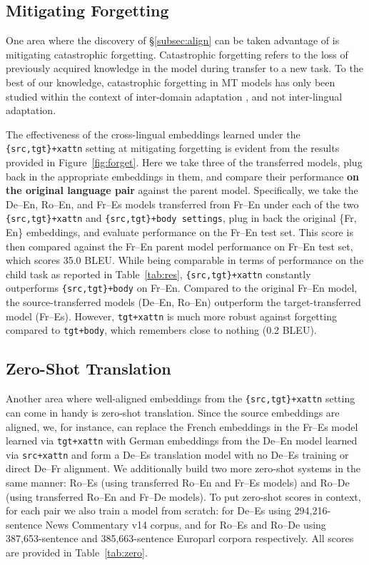 \subsection{Mitigating Forgetting}

One area where the discovery of \S\ref{subsec:align} can be taken advantage of is mitigating catastrophic forgetting. Catastrophic forgetting refers to the loss of previously acquired knowledge in the model during transfer to a new task. To the best of our knowledge, catastrophic forgetting in MT models has only been studied within the context of inter-domain adaptation \cite{thompson-etal-2019-overcoming,gu-feng-2020-investigating}, and not inter-lingual adaptation.

The effectiveness of the cross-lingual embeddings learned under the  \texttt{\{src,tgt\}+xattn} setting at mitigating forgetting is evident from the results provided in Figure~\ref{fig:forget}. Here we take three of the transferred models, plug back in the appropriate embeddings in them, and compare their performance \textbf{on the original language pair} against the parent model. Specifically, we take the De--En, Ro--En, and Fr--Es models transferred from Fr--En under each of the two \texttt{\{src,tgt\}+xattn} and \texttt{\{src,tgt\}+body settings}, plug in back the original \{Fr, En\} embeddings, and evaluate performance on the Fr--En test set. This score is then compared against the Fr--En parent model performance on Fr--En test set, which scores 35.0 BLEU. While being comparable in terms of performance on the child task as reported in Table~\ref{tab:res}, \texttt{\{src,tgt\}+xattn} constantly outperforms \texttt{\{src,tgt\}+body} on Fr--En. Compared to the original Fr--En model, the source-transferred models (De--En, Ro--En) outperform the target-transferred model (Fr--Es). However, \texttt{tgt+xattn} is much more robust against forgetting compared to \texttt{tgt+body}, which remembers close to nothing (0.2 BLEU).

\subsection{Zero-Shot Translation}

Another area where well-aligned embeddings from the \texttt{\{src,tgt\}+xattn} setting can come in handy is zero-shot translation. Since the source embeddings are aligned, we, for instance, can replace the French embeddings in the Fr--Es model learned via \texttt{tgt+xattn} with German embeddings from the De--En model learned via \texttt{src+xattn} and form a De--Es translation model with no De--Es training or direct De--Fr alignment. We additionally build two more zero-shot systems in the same manner: Ro--Es (using transferred Ro--En and Fr--Es models) and Ro--De (using transferred Ro--En and Fr--De models). To put zero-shot scores in context, for each pair we also train a model from scratch: for De--Es using 294,216-sentence News Commentary v14 corpus, and for Ro--Es and Ro--De using 387,653-sentence and 385,663-sentence Europarl corpora respectively. All scores are provided in Table~\ref{tab:zero}.

